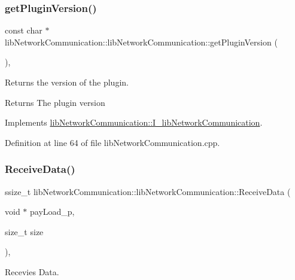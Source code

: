 \subsubsection{\texorpdfstring{getPluginVersion()}{getPluginVersion()}}
{\footnotesize\ttfamily const char $\ast$ lib\+Network\+Communication\+::lib\+Network\+Communication\+::get\+Plugin\+Version (\begin{DoxyParamCaption}{ }\end{DoxyParamCaption})\hspace{0.3cm}{\ttfamily [override]}, {\ttfamily [virtual]}}



Returns the version of the plugin. 

\begin{DoxyReturn}{Returns}
The plugin version 
\end{DoxyReturn}


Implements \mbox{\hyperlink{classlibNetworkCommunication_1_1I__libNetworkCommunication_a07a5da99fc896208065f34aa89453499}{lib\+Network\+Communication\+::\+I\+\_\+lib\+Network\+Communication}}.



Definition at line 64 of file lib\+Network\+Communication.\+cpp.

\mbox{\label{classlibNetworkCommunication_1_1libNetworkCommunication_adbe327ebbc37c81231c3f9843300c778}} 
\subsubsection{\texorpdfstring{ReceiveData()}{ReceiveData()}}
{\footnotesize\ttfamily ssize\+\_\+t lib\+Network\+Communication\+::lib\+Network\+Communication\+::\+Receive\+Data (\begin{DoxyParamCaption}\item[{void $\ast$}]{pay\+Load\+\_\+p,  }\item[{size\+\_\+t}]{size }\end{DoxyParamCaption})\hspace{0.3cm}{\ttfamily [override]}, {\ttfamily [virtual]}}



Recevies Data. 

